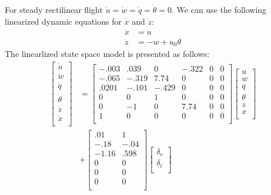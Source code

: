 For steady rectilinear flight $\dot u = \dot w = \dot q = \dot \theta =
0$. We can use the following linearized dynamic equations for $\dot x$
and $\dot z$:
\begin{align}
  \dot x &= u \\
  \dot z &= -w + u_0 \theta 
\end{align}
The linearlized state space model is presented as follows: 
\begin{align*}
  \begin{bmatrix}
    \dot u \\
    \dot w \\
    \dot q \\
    \dot \theta \\
    \dot z \\
    \dot x \\
  \end{bmatrix}
  &=
  \begin{bmatrix}
    -.003 & .039 & 0 & -.322 & 0 & 0 \\
    -.065 & -.319 & 7.74 & 0 & 0 & 0 \\
    .0201 & -.101 & -.429 & 0 & 0 & 0\\
    0 & 0 & 1 & 0 & 0 & 0 \\
    0 & -1 & 0 & 7.74 & 0 & 0 \\
    1 & 0 & 0 & 0 & 0 & 0 \\
  \end{bmatrix} 
  \begin{bmatrix}
    u \\
    w \\
    q \\
    \theta \\
    z \\
    x \\
  \end{bmatrix} \\
  &+  
  \begin{bmatrix}
    .01 & 1 \\
    -.18 & -.04 \\
    -1.16 & .598 \\
    0 & 0 \\
    0 & 0 \\
    0 & 0 \\
  \end{bmatrix}
  \begin{bmatrix}
    \delta_{e} \\
    \delta_{t} \\
  \end{bmatrix} \\
\end{align*}

